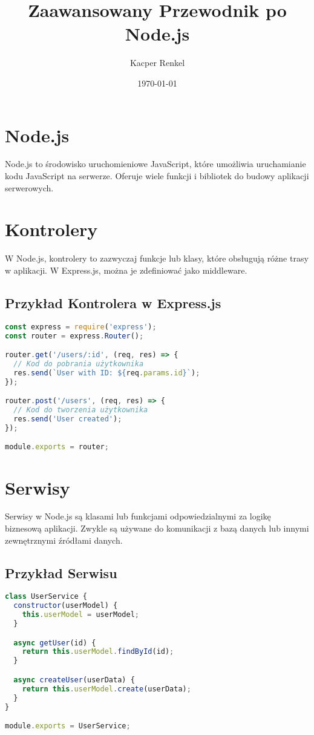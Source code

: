 \documentclass[a4paper,12pt]{article}
\title{Zaawansowany Przewodnik po Node.js}
\author{Kacper Renkel}
\date{\today}
\begin{document}
\maketitle

\tableofcontents
\newpage

\section{Node.js}
Node.js to środowisko uruchomieniowe JavaScript, które umożliwia uruchamianie kodu JavaScript na serwerze. Oferuje wiele funkcji i bibliotek do budowy aplikacji serwerowych.

\section{Kontrolery}
W Node.js, kontrolery to zazwyczaj funkcje lub klasy, które obsługują różne trasy w aplikacji. W Express.js, można je zdefiniować jako middleware.

\subsection{Przykład Kontrolera w Express.js}
\begin{lstlisting}[language=JavaScript, caption=Przykład kontrolera w Express.js]
const express = require('express');
const router = express.Router();

router.get('/users/:id', (req, res) => {
  // Kod do pobrania użytkownika
  res.send(`User with ID: ${req.params.id}`);
});

router.post('/users', (req, res) => {
  // Kod do tworzenia użytkownika
  res.send('User created');
});

module.exports = router;
\end{lstlisting}

\section{Serwisy}
Serwisy w Node.js są klasami lub funkcjami odpowiedzialnymi za logikę biznesową aplikacji. Zwykle są używane do komunikacji z bazą danych lub innymi zewnętrznymi źródłami danych.

\subsection{Przykład Serwisu}
\begin{lstlisting}[language=JavaScript, caption=Przykład serwisu w Node.js]
class UserService {
  constructor(userModel) {
    this.userModel = userModel;
  }

  async getUser(id) {
    return this.userModel.findById(id);
  }

  async createUser(userData) {
    return this.userModel.create(userData);
  }
}

module.exports = UserService;
\end{lstlisting}
\end{document}
